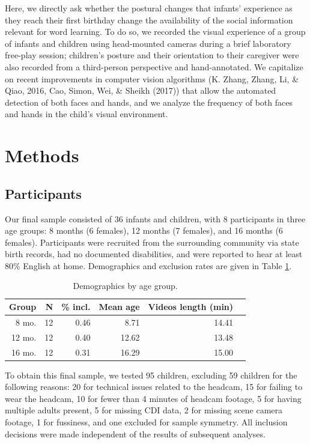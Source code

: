 \documentclass[10pt, letterpaper]{article}
\begin{document}
Here, we directly ask whether the postural changes that infants'
experience as they reach their first birthday change the availability of
the social information relevant for word learning. To do so, we recorded
the visual experience of a group of infants and children using
head-mounted cameras during a brief laboratory free-play session;
children's posture and their orientation to their caregiver were also
recorded from a third-person perspective and hand-annotated. We
capitalize on recent improvements in computer vision algorithms (K.
Zhang, Zhang, Li, \& Qiao, 2016, Cao, Simon, Wei, \& Sheikh (2017)) that
allow the automated detection of both faces and hands, and we analyze
the frequency of both faces and hands in the child's visual environment.

\section{Methods}\label{methods}

\subsection{Participants}\label{participants}

Our final sample consisted of 36 infants and children, with 8
participants in three age groups: 8 months (6 females), 12 months (7
females), and 16 months (6 females). Participants were recruited from
the surrounding community via state birth records, had no documented
disabilities, and were reported to hear at least 80\% English at home.
Demographics and exclusion rates are given in Table \ref{tab:pop}.

\begin{table}[H]
\centering
\begin{tabular}{rrrrrr}
  \hline
 Group & N & \% incl. & Mean age & Videos length (min) \\ 
  \hline
   8 mo. &   12 & 0.46 & 8.71 & 14.41 \\ 
   12 mo. &  12 & 0.40 & 12.62 & 13.48 \\ 
   16 mo. &  12 & 0.31 & 16.29 & 15.00\\ 
   \hline
\end{tabular}
\caption{\label{tab:pop} Demographics by age group.}
\end{table}

To obtain this final sample, we tested 95 children, excluding 59
children for the following reasons: 20 for technical issues related to
the headcam, 15 for failing to wear the headcam, 10 for fewer than 4
minutes of headcam footage, 5 for having multiple adults present, 5 for
missing CDI data, 2 for missing scene camera footage, 1 for fussiness,
and one excluded for sample symmetry. All inclusion decisions were made
independent of the results of subsequent analyses.
\end{document}
